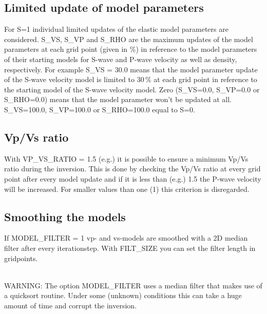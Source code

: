 \subsection{Limited update of model parameters}
{\color{blue}{\begin{verbatim}
"Limited model update in reference to the starting model" : "comment",
"S" : "0",
"S_VS" : "0.0",
"S_VP" : "0.0",
"S_RHO" : "0.0",
\end{verbatim}}}
{\color{red}{\begin{verbatim}
Default values are:
	S=0
\end{verbatim}}}
For S=1 individual limited updates of the elastic model parameters are considered. S\_VS, S\_VP and S\_RHO are the maximum updates of the model parameters at each grid point (given in \%) in reference to the model parameters of their starting models for S-wave and P-wave velocity as well as density, respectively. For example S\_VS = 30.0 means that the model parameter update of the S-wave velocity model is limited to 30\,\% at each grid point in reference to the starting model of the S-wave velocity model. Zero (S\_VS=0.0, S\_VP=0.0 or S\_RHO=0.0) means that the model parameter won't be updated at all. S\_VS=100.0, S\_VP=100.0 or S\_RHO=100.0 equal to S=0.

\subsection{Vp/Vs ratio}
{\color{blue}{\begin{verbatim}
"Minimum Vp/Vs-ratio" : "comment",
"VP_VS_RATIO" : "1.5",
\end{verbatim}}}
{\color{red}{\begin{verbatim}
Default values are:
	VP_VS_RATIO > 1
\end{verbatim}}}
With VP\_VS\_RATIO = 1.5 (e.g.) it is possible to ensure a minimum Vp/Vs ratio during the inversion. This is done by checking the Vp/Vs ratio at every grid point after every model update and if it is less than (e.g.) 1.5 the P-wave velocity will be increased. For smaller values than one (1) this criterion is disregarded.

\subsection{Smoothing the models}
{\color{blue}{\begin{verbatim}
"Definition of smoothing the models vp and vs" : "comment",
			"MODEL_FILTER" : "0",
			"FILT_SIZE" : "5",
\end{verbatim}}}

{\color{red}{\begin{verbatim}
Default values are:
	MODEL_FILTER=0
\end{verbatim}}}

If MODEL\_FILTER = 1 vp- and vs-models are smoothed with a 2D median filter after every iterationstep. With FILT\_SIZE you can set the filter length in gridpoints.

\ \\
WARNING: The option MODEL\_FILTER uses a median filter that makes use of a quicksort routine. Under some (unknown) conditions this can take a huge amount of time and corrupt the inversion.
